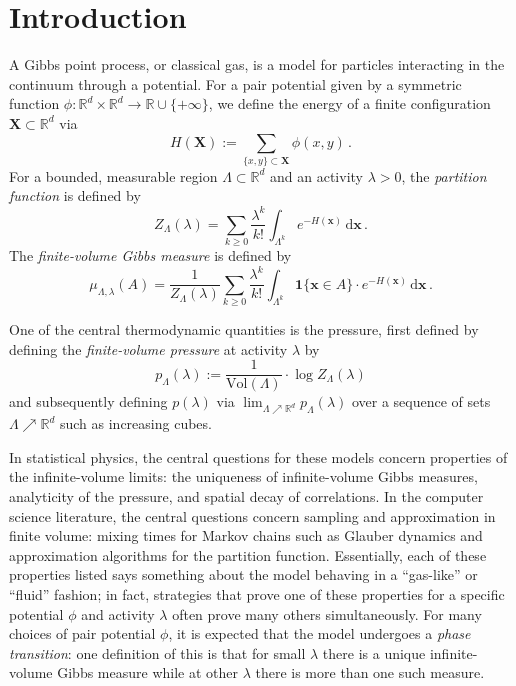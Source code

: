 \documentclass[10pt]{amsart}
\theoremstyle{definition}
\theoremstyle{remark}
\newcommand{\one}{\boldsymbol{1}}
\newcommand{\bX}{\mathbf{X}}
\newcommand{\R}{\mathbb{R}}
\newcommand{\diff}{\mathrm{d}}
\newcommand{\vol}{\mathrm{Vol}}
\begin{document}
	\maketitle
	
	\section{Introduction}
	
	
	A Gibbs point process, or classical gas, is a model for particles interacting in the continuum through a potential.  For a pair potential given by a symmetric function $\phi: \R^d \times \R^d \to \R \cup \{+\infty\}$, we define the energy of a finite configuration $\bX \subset \R^d$ via $$H(\bX):= \sum_{\{x,y\} \subset \bX } \phi(x,y)\,.$$
	For a bounded, measurable region $\Lambda \subset \R^d$ and an activity $\lambda > 0$, the \emph{partition function} is defined by \begin{equation*}
		Z_{\Lambda}(\lambda) = \sum_{k \geq 0} \frac{\lambda^k}{k!} \int_{\Lambda^k} e^{-H(\mathbf{x})} \,\diff \mathbf{x}\,.
	\end{equation*}
	The \emph{finite-volume Gibbs measure} is defined by $$\mu_{\Lambda,\lambda}(A) = \frac{1}{Z_\Lambda(\lambda)} \sum_{k \geq 0} \frac{\lambda^k}{k!} \int_{\Lambda^k} \one{\{\mathbf{x} \in A}\} \cdot e^{-H(\mathbf{x})} \,\diff \mathbf{x}\,. $$
	
	One of the central thermodynamic quantities is the pressure, first defined by defining the \emph{finite-volume pressure} at activity $\lambda$ by $$p_{\Lambda}(\lambda) := \frac{1}{\vol(\Lambda)} \cdot \log Z_{\Lambda}(\lambda)$$
	and subsequently defining $p(\lambda)$ via $\lim_{\Lambda \nearrow \R^d} p_{\Lambda}(\lambda)$ over a sequence of sets $\Lambda \nearrow \R^d$ such as increasing cubes. 
	
	
	In statistical physics, the central questions for these models concern properties of the infinite-volume limits: the uniqueness of infinite-volume Gibbs measures, analyticity of the pressure, and spatial decay of correlations.  In the computer science literature, the central questions concern sampling and approximation in finite volume: mixing times for Markov chains such as Glauber dynamics and approximation algorithms for the partition function.  Essentially, each of these properties listed says something about the model behaving in a ``gas-like'' or ``fluid'' fashion; in fact, strategies that prove one of these properties for a specific potential $\phi$ and activity $\lambda$ often prove many others  simultaneously.  For many choices of pair potential $\phi$, it is expected that the model undergoes a \emph{phase transition}: one definition of this is that for small $\lambda$ there is a unique infinite-volume Gibbs measure while at other $\lambda$ there is more than one such measure.  
	
\end{document}
